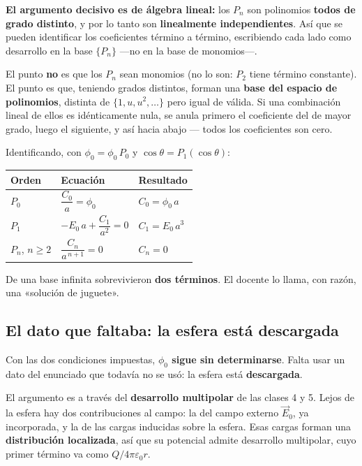 \documentclass[12pt,a4paper]{article}
\begin{document}
\textbf{El argumento decisivo es de álgebra lineal:} los $P_n$ son polinomios
\textbf{todos de grado distinto}, y por lo tanto son \textbf{linealmente
independientes}. Así que se pueden identificar los coeficientes término a
término, escribiendo cada lado como desarrollo en la base $\{P_n\}$ ---no en la
base de monomios---.

\begin{warnbox}
El punto \textbf{no} es que los $P_n$ sean monomios (no lo son: $P_2$ tiene
término constante). El punto es que, teniendo grados distintos, forman una
\textbf{base del espacio de polinomios}, distinta de $\{1,u,u^2,\dots\}$ pero
igual de válida. Si una combinación lineal de ellos es idénticamente nula, se
anula primero el coeficiente del de mayor grado, luego el siguiente, y así hacia
abajo --- todos los coeficientes son cero.
\end{warnbox}

Identificando, con $\phi_0 = \phi_0\,P_0$ y $\cos\theta = P_1(\cos\theta)$:

\begin{table}[H]
  \centering
  \begin{tabular}{@{}lll@{}}
    \toprule
    \textbf{Orden} & \textbf{Ecuación} & \textbf{Resultado} \\
    \midrule
    $P_0$ & $\dfrac{C_0}{a} = \phi_0$ & $C_0 = \phi_0\,a$ \\[0.7em]
    $P_1$ & $-E_0\,a + \dfrac{C_1}{a^{2}} = 0$ & $C_1 = E_0\,a^{3}$ \\[0.7em]
    $P_n$, $n\ge2$ & $\dfrac{C_n}{a^{\,n+1}} = 0$ & $C_n = 0$ \\
    \bottomrule
  \end{tabular}
\end{table}

De una base infinita sobrevivieron \textbf{dos términos}. El docente lo llama, con
razón, una «solución de juguete».

\subsection{El dato que faltaba: la esfera está descargada}

Con las dos condiciones impuestas, \textbf{$\phi_0$ sigue sin determinarse}. Falta
usar un dato del enunciado que todavía no se usó: la esfera está
\textbf{descargada}.

El argumento es a través del \textbf{desarrollo multipolar} de las clases 4 y 5.
Lejos de la esfera hay dos contribuciones al campo: la del campo externo
$\vec E_0$, ya incorporada, y la de las cargas inducidas sobre la esfera. Esas
cargas forman una \textbf{distribución localizada}, así que su potencial admite
desarrollo multipolar, cuyo primer término va como $Q/4\pi\varepsilon_0 r$.
\end{document}
